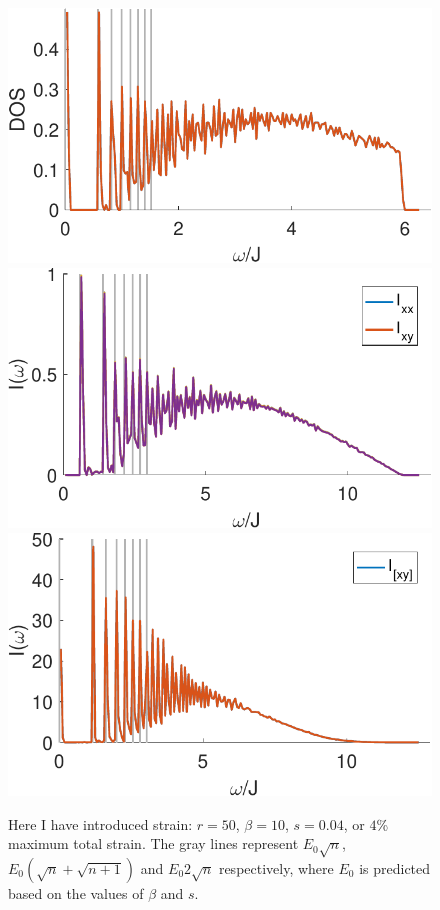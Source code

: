 \documentclass[reprint,amsmath,amssymb,aps,prl,groupedaddress,nofootinbib,superscriptaddress]{revtex4-1}
\newcommand{\1}{\mathds{1}}
\begin{document}
\begin{figure}
	\centering
	\includegraphics[width=0.9\linewidth]{stretch_DOS_rmax_50_b_10_c_40_p_0-eps-converted-to.pdf} 
	\includegraphics[width=0.9\linewidth]{stretch_I2_rmax_50_b_10_c_40_p_0-eps-converted-to.pdf} 
	\includegraphics[width=0.9\linewidth]{stretch_I3_rmax_50_b_10_c_40_p_0-eps-converted-to.pdf}
	\caption{Here I have introduced strain: $r=50$, $\beta=10$, $s=0.04$, or $4$\% maximum total strain. %
	The gray lines represent $E_0 \sqrt{n}$, $E_0 (\sqrt{n} + \sqrt{n+1})$ and $E_0 2 \sqrt{n}$ respectively, where $E_0$ is predicted based on the values of $\beta$ and $s$.}
	\label{fig:stretch2}
\end{figure}
\end{document}
